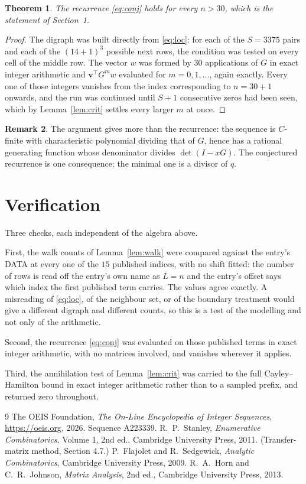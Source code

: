 \documentclass[11pt,a4paper]{article}
\theoremstyle{plain}
\newtheorem{theorem}{Theorem}
\theoremstyle{definition}
\newtheorem{remark}[theorem]{Remark}
\begin{document}
\begin{theorem}
The recurrence \eqref{eq:conj} holds for every $n>30$, which is the statement of
Section~1.
\end{theorem}

\begin{proof}
The digraph was built directly from \eqref{eq:loc}: for each of the $S=3375$ pairs and each
of the $(14+1)^{3}$ possible next rows, the condition was tested on every cell of
the middle row. The vector $w$ was formed by $30$ applications of $G$ in exact integer
arithmetic and $\mathbf{v}^{\!\top}G^{m}w$ evaluated for $m=0,1,\dots$, again exactly.
Every one of those integers vanishes from the index corresponding to $n=30+1$ onwards,
and the run was continued until $S+1$ consecutive zeros had been seen, which by
Lemma~\ref{lem:crit} settles every larger $m$ at once.
\end{proof}

\begin{remark}
The argument gives more than the recurrence: the sequence is $C$-finite with characteristic
polynomial dividing that of $G$, hence has a rational generating function whose denominator
divides $\det(I-xG)$. The conjectured recurrence is one consequence; the minimal one is a
divisor of $q$.
\end{remark}

\section{Verification}

Three checks, each independent of the algebra above.

First, the walk counts of Lemma~\ref{lem:walk} were compared against the entry's DATA at
every one of the $15$ published indices, with no shift fitted: the number of rows is
read off the entry's own name as $L=n$ and the entry's offset says which index the first
published term carries. The values agree exactly. A misreading of \eqref{eq:loc}, of the
neighbour set, or of the boundary treatment would give a different digraph and different
counts, so this is a test of the modelling and not only of the arithmetic.

Second, the recurrence \eqref{eq:conj} was evaluated on those published terms in exact
integer arithmetic, with no matrices involved, and vanishes wherever it applies.

Third, the annihilation test of Lemma~\ref{lem:crit} was carried to the full
Cayley--Hamilton bound in exact integer arithmetic rather than to a sampled prefix, and
returned zero throughout.

\begin{thebibliography}{9}
 The OEIS Foundation, \emph{The On-Line Encyclopedia of Integer
Sequences}, \url{https://oeis.org}, 2026. Sequence A223339.
 R.~P.~Stanley, \emph{Enumerative Combinatorics}, Volume 1, 2nd ed.,
Cambridge University Press, 2011. (Transfer-matrix method, Section 4.7.)
 P.~Flajolet and R.~Sedgewick, \emph{Analytic Combinatorics}, Cambridge
University Press, 2009.
 R.~A.~Horn and C.~R.~Johnson, \emph{Matrix Analysis}, 2nd ed., Cambridge
University Press, 2013.
\end{thebibliography}
\end{document}
